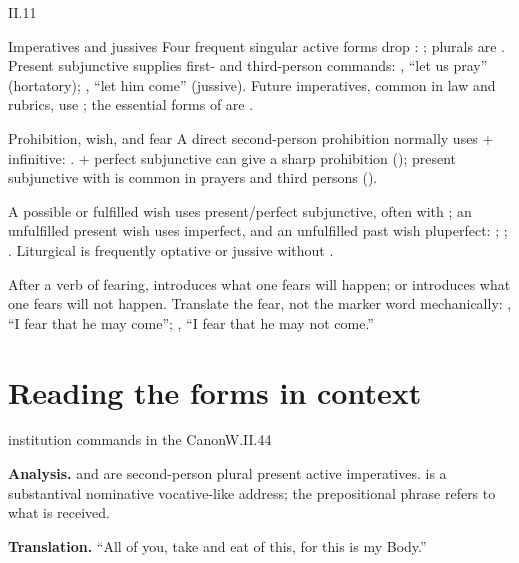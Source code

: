 \begin{courseunit}{II.11}
\begin{grammarbox}{Imperatives and jussives}
Four frequent singular active forms drop : ; plurals are
.  Present subjunctive supplies first- and third-person
commands: , ``let us pray'' (hortatory); , ``let him come''
(jussive).  Future imperatives, common in law and rubrics, use ; the
essential forms of  are .
\end{grammarbox}

\begin{grammarbox}{Prohibition, wish, and fear}
A direct second-person prohibition normally uses  + infinitive:
.   + perfect subjunctive can give a sharp prohibition
(); present subjunctive with  is common in prayers and third
persons ().

A possible or fulfilled wish uses present/perfect subjunctive, often with ; an
unfulfilled present wish uses imperfect, and an unfulfilled past wish pluperfect:
; ; .  Liturgical
 is frequently optative or jussive without .

After a verb of fearing,  introduces what one fears will happen;  or
 introduces what one fears will not happen.  Translate the fear, not the marker
word mechanically: , ``I fear that he may come'';
, ``I fear that he may not come.''
\end{grammarbox}

\section{Reading the forms in context}

\begin{workedexample}{institution commands in the Canon}{W.II.44}

\textbf{Analysis.}   and  are second-person plural present
active imperatives.   is a substantival nominative vocative-like address; the
prepositional phrase  refers to what is received.

\textbf{Translation.}  ``All of you, take and eat of this, for this is my Body.''
\end{workedexample}


\end{courseunit}
